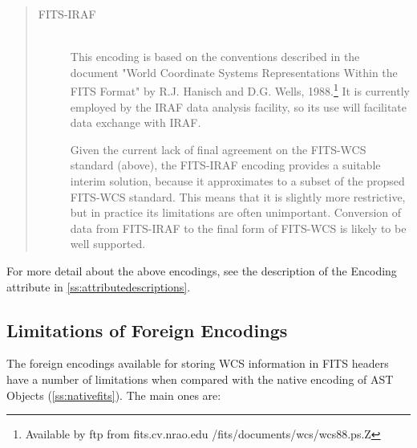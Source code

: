 \documentclass[twoside,11pt]{article}
\newenvironment{latexonly}{}{}
\newcommand{\appref}[1]{Appendix~\ref{#1}}
\newcommand{\secref}[1]{\S\ref{#1}}
\renewcommand{\appref}[1]{\ref{#1}}
\renewcommand{\secref}[1]{\ref{#1}}
\begin{document}
\begin{quote}
\begin{description}
\item[FITS-IRAF]\begin{latexonly}\mbox{}\\ \end{latexonly}
This encoding is based on the conventions described in the document
"World Coordinate Systems Representations Within the FITS Format" by
R.J. Hanisch and D.G. Wells, 1988.\footnote{Available by ftp from
fits.cv.nrao.edu /fits/documents/wcs/wcs88.ps.Z} It is currently
employed by the IRAF data analysis facility, so its use will
facilitate data exchange with IRAF.

Given the current lack of final agreement on the FITS-WCS standard
(above), the FITS-IRAF encoding provides a suitable interim solution,
because it approximates to a subset of the propsed FITS-WCS standard.
This means that it is slightly more restrictive, but in practice its
limitations are often unimportant. Conversion of data from FITS-IRAF
to the final form of FITS-WCS is likely to be well supported.
\end{description}
\end{quote}

For more detail about the above encodings, see the description of the
Encoding attribute in \appref{ss:attributedescriptions}.

\subsection{\label{ss:foreignfitslimitations}Limitations of Foreign Encodings}

The foreign encodings available for storing WCS information in FITS
headers have a number of limitations when compared with the native
encoding of AST Objects (\secref{ss:nativefits}). The main ones are:
\end{document}
